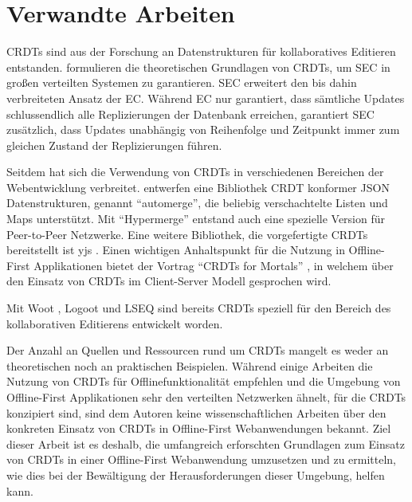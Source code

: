 \documentclass[a4paper, 12pt]{scrreprt}
\begin{document}
\section{Verwandte Arbeiten}
\label{sec:VerwandteArbeiten}

\acp{CRDT} sind aus der Forschung an Datenstrukturen für kollaboratives Editieren entstanden. \citet{InproceedingsCRDTOriginal} formulieren die theoretischen Grundlagen von \acp{CRDT}, um \ac{SEC} in großen verteilten Systemen zu garantieren. \ac{SEC} erweitert den bis dahin verbreiteten Ansatz der \ac{EC}. Während EC nur garantiert, dass sämtliche Updates schlussendlich alle Replizierungen der Datenbank erreichen, garantiert SEC zusätzlich, dass Updates unabhängig von Reihenfolge und Zeitpunkt immer zum gleichen Zustand der Replizierungen führen.

Seitdem hat sich die Verwendung von \acp{CRDT} in verschiedenen Bereichen der Webentwicklung verbreitet. \citet{ArticleCRDTJSON} entwerfen eine Bibliothek CRDT konformer \ac{JSON} Datenstrukturen, genannt \enquote{automerge}, die beliebig verschachtelte Listen und Maps unterstützt. Mit \enquote{Hypermerge} entstand auch eine spezielle Version für Peer-to-Peer Netzwerke. Eine weitere Bibliothek, die vorgefertigte \acp{CRDT} bereitstellt ist yjs \autocite{inproceedingsYjs}. Einen wichtigen Anhaltspunkt für die Nutzung in Offline-First Applikationen bietet der Vortrag \enquote{\acp{CRDT} for Mortals} \autocite{OnlineCrdtsForMortals}, in welchem über den Einsatz von \acp{CRDT} im Client-Server Modell gesprochen wird.  

Mit Woot \autocite{InproceedingsCRDTWoot}, Logoot \autocite{InproceedingsCRDTLogoot} und LSEQ \autocite{InproceedingsCRDTLSEQ} sind bereits \acp{CRDT} speziell für den Bereich des kollaborativen Editierens entwickelt worden. 

Der Anzahl an Quellen und Ressourcen rund um \acp{CRDT} mangelt es weder an theoretischen noch an praktischen Beispielen. Während einige Arbeiten die Nutzung von \acp{CRDT} für Offlinefunktionalität empfehlen und die Umgebung von Offline-First Applikationen sehr den verteilten Netzwerken ähnelt, für die \acp{CRDT} konzipiert sind, sind dem Autoren keine wissenschaftlichen Arbeiten über den konkreten Einsatz von \acp{CRDT} in Offline-First Webanwendungen bekannt. Ziel dieser Arbeit ist es deshalb, die umfangreich erforschten Grundlagen zum Einsatz von \acp{CRDT} in einer Offline-First Webanwendung umzusetzen und zu ermitteln, wie dies bei der Bewältigung der Herausforderungen dieser Umgebung, helfen kann.
\end{document}
